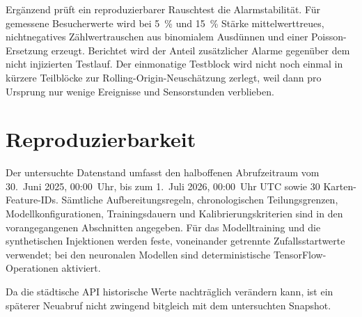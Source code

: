 Ergänzend prüft ein reproduzierbarer Rauschtest die Alarmstabilität. Für
gemessene Besucherwerte wird bei 5~\% und 15~\% Stärke mittelwerttreues,
nichtnegatives Zählwertrauschen aus binomialem Ausdünnen und einer
Poisson-Ersetzung erzeugt. Berichtet wird der Anteil zusätzlicher Alarme
gegenüber dem nicht injizierten Testlauf. Der einmonatige Testblock wird nicht
noch einmal in kürzere Teilblöcke zur Rolling-Origin-Neuschätzung zerlegt,
weil dann pro Ursprung nur wenige Ereignisse und Sensorstunden verblieben.

\section{Reproduzierbarkeit}

Der untersuchte Datenstand umfasst den halboffenen Abrufzeitraum vom
30.~Juni 2025, 00:00~Uhr, bis zum 1.~Juli 2026, 00:00~Uhr UTC sowie 30
Karten-Feature-IDs. Sämtliche Aufbereitungsregeln, chronologischen
Teilungsgrenzen, Modellkonfigurationen, Trainingsdauern und
Kalibrierungskriterien sind in den vorangegangenen Abschnitten angegeben. Für
das Modelltraining und die synthetischen Injektionen werden feste, voneinander
getrennte Zufallsstartwerte verwendet; bei den neuronalen Modellen sind
deterministische TensorFlow-Operationen aktiviert.

Da die städtische API historische Werte nachträglich verändern kann, ist ein
späterer Neuabruf nicht zwingend bitgleich mit dem untersuchten Snapshot.